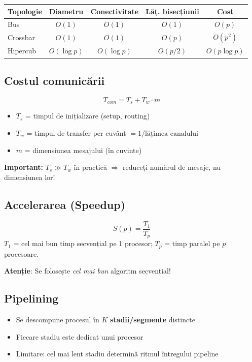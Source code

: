 \documentclass[a4paper,11pt]{article}
\newcommand{\thead}[1]{\cellcolor{tblheader}\color{white}\textbf{#1}}
\begin{document}
\begin{center}
\begin{tabular}{lcccc}
\toprule
\thead{Topologie} & \thead{Diametru} & \thead{Conectivitate} & \thead{Lăț. bisecțiunii} & \thead{Cost} \\
\midrule
Bus & $O(1)$ & $O(1)$ & $O(1)$ & $O(p)$ \\
Crossbar & $O(1)$ & $O(1)$ & $O(p)$ & $O(p^2)$ \\
Hipercub & $O(\log p)$ & $O(\log p)$ & $O(p/2)$ & $O(p \log p)$ \\
\bottomrule
\end{tabular}
\end{center}

\subsection{Costul comunicării}

\begin{formulabox}
\[
T_{com} = T_s + T_w \cdot m
\]
\begin{itemize}[noitemsep]
  \item $T_s$ = timpul de inițializare (setup, routing)
  \item $T_w$ = timpul de transfer per cuvânt $= 1 / \text{lățimea canalului}$
  \item $m$ = dimensiunea mesajului (în cuvinte)
\end{itemize}
\textbf{Important:} $T_s \gg T_w$ în practică $\Rightarrow$ reduceți numărul de mesaje, nu dimensiunea lor!
\end{formulabox}

\subsection{Accelerarea (Speedup)}

\begin{formulabox}
\[
S(p) = \frac{T_1}{T_p}
\]
$T_1$ = cel mai bun timp secvențial pe 1 procesor; \; $T_p$ = timp paralel pe $p$ procesoare.

\textbf{Atenție}: Se folosește \emph{cel mai bun} algoritm secvențial!
\end{formulabox}

\subsection{Pipelining}

\begin{itemize}[noitemsep]
  \item Se descompune procesul în $K$ \textbf{stadii/segmente} distincte
  \item Fiecare stadiu este dedicat unui procesor
  \item Limitare: cel mai lent stadiu determină ritmul întregului pipeline
\end{itemize}
\end{document}
